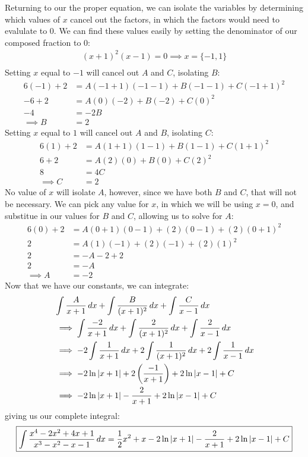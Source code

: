 \documentclass[12pt]{article}
\begin{document}
Returning to our the proper equation, we can isolate the variables by determining which values 
of $x$ cancel out the factors, in which the factors would need to evalulate to 0. We can find 
these values easily by setting the denominator of our composed fraction to 0:
\begin{align*}
    (x+1)^2(x-1) = 0 \implies x = \{-1, 1\} \\
\end{align*}
Setting $x$ equal to $-1$ will cancel out $A$ and $C$, isolating $B$:
\begin{align*}
    6(-1)+2 &= A(-1+1)(-1-1) + B(-1-1) + C(-1+1)^2 \\
       -6+2 &= A(0)(-2) + B(-2) + C(0)^2 \\
         -4 &= -2B \\
 \implies B &= 2
\end{align*}
Setting $x$ equal to $1$ will cancel out $A$ and $B$, isolating $C$:
\begin{align*}
    6(1)+2 &= A(1+1)(1-1) + B(1-1) + C(1+1)^2 \\
       6+2 &= A(2)(0) + B(0) + C(2)^2 \\
         8 &= 4C \\
\implies C &= 2
\end{align*}
No value of $x$ will isolate $A$, however, since we have both $B$ and $C$, that will 
not be necessary. We can pick any value for $x$, in which we will be using $x=0$, and 
substitue in our values for $B$ and $C$, allowing us to solve for $A$:  
\begin{align*}
    6(0)+2 &= A(0+1)(0-1) + (2)(0-1) + (2)(0+1)^2 \\
         2 &= A(1)(-1) + (2)(-1) + (2)(1)^2 \\
         2 &= -A - 2 + 2 \\
         2 &= -A \\
\implies A &= -2
\end{align*}
Now that we have our constants, we can integrate:
\begin{align*}
    &\int \frac{A}{x+1} \,dx + \int \frac{B}{(x+1)^2} \,dx + \int \frac{C}{x-1} \,dx \\
    &\implies \int \frac{-2}{x+1} \,dx + \int \frac{2}{(x+1)^2} \,dx + \int \frac{2}{x-1} \,dx \\
    &\implies -2\int \frac{1}{x+1} \,dx + 2\int \frac{1}{(x+1)^2} \,dx + 2\int \frac{1}{x-1} \,dx \\
    &\implies -2\ln\abs{x+1} + 2\left(\frac{-1}{x+1}\right) + 2\ln\abs{x-1} + C\\
    &\implies -2\ln\abs{x+1} - \frac{2}{x+1} + 2\ln\abs{x-1} + C\\
\end{align*}
giving us our complete integral:
\[ \boxed{\int \frac{x^4-2x^2+4x+1}{x^3-x^2-x-1} \,dx = \frac{1}{2}x^2 + x - 2\ln\abs{x+1} - \frac{2}{x+1} + 2\ln\abs{x-1} + C} \]
\end{document}
